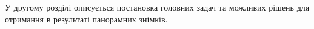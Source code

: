 У другому розділі описується постановка головних 
задач та можливих рішень для отримання в 
результаті панорамних знімків.
